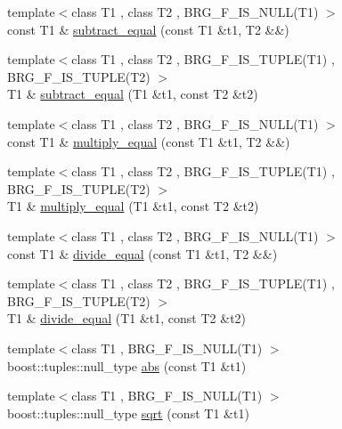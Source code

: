 \begin{DoxyCompactItemize}
\item 
{\footnotesize template$<$class T1 , class T2 , B\-R\-G\-\_\-\-F\-\_\-\-I\-S\-\_\-\-N\-U\-L\-L(\-T1) $>$ }\\const T1 \& \hyperlink{namespaceIceBRG_aba433f0f1df8de11e5f738da8ef67d39}{subtract\-\_\-equal} (const T1 \&t1, T2 \&\&)
\item 
{\footnotesize template$<$class T1 , class T2 , B\-R\-G\-\_\-\-F\-\_\-\-I\-S\-\_\-\-T\-U\-P\-L\-E(\-T1) , B\-R\-G\-\_\-\-F\-\_\-\-I\-S\-\_\-\-T\-U\-P\-L\-E(\-T2) $>$ }\\T1 \& \hyperlink{namespaceIceBRG_aa00439fb1f98b5ab3fd4435a4ff85325}{subtract\-\_\-equal} (T1 \&t1, const T2 \&t2)
\item 
{\footnotesize template$<$class T1 , class T2 , B\-R\-G\-\_\-\-F\-\_\-\-I\-S\-\_\-\-N\-U\-L\-L(\-T1) $>$ }\\const T1 \& \hyperlink{namespaceIceBRG_a7a4405ff31b49e9215bd1ace7a8d1e9d}{multiply\-\_\-equal} (const T1 \&t1, T2 \&\&)
\item 
{\footnotesize template$<$class T1 , class T2 , B\-R\-G\-\_\-\-F\-\_\-\-I\-S\-\_\-\-T\-U\-P\-L\-E(\-T1) , B\-R\-G\-\_\-\-F\-\_\-\-I\-S\-\_\-\-T\-U\-P\-L\-E(\-T2) $>$ }\\T1 \& \hyperlink{namespaceIceBRG_a8a9b9c18a8f33f1e7a11e3c5074ad657}{multiply\-\_\-equal} (T1 \&t1, const T2 \&t2)
\item 
{\footnotesize template$<$class T1 , class T2 , B\-R\-G\-\_\-\-F\-\_\-\-I\-S\-\_\-\-N\-U\-L\-L(\-T1) $>$ }\\const T1 \& \hyperlink{namespaceIceBRG_afa3822bbe4a1004507a161f17facc454}{divide\-\_\-equal} (const T1 \&t1, T2 \&\&)
\item 
{\footnotesize template$<$class T1 , class T2 , B\-R\-G\-\_\-\-F\-\_\-\-I\-S\-\_\-\-T\-U\-P\-L\-E(\-T1) , B\-R\-G\-\_\-\-F\-\_\-\-I\-S\-\_\-\-T\-U\-P\-L\-E(\-T2) $>$ }\\T1 \& \hyperlink{namespaceIceBRG_a5634c6e0abab0629573daa2c53f9101b}{divide\-\_\-equal} (T1 \&t1, const T2 \&t2)
\item 
{\footnotesize template$<$class T1 , B\-R\-G\-\_\-\-F\-\_\-\-I\-S\-\_\-\-N\-U\-L\-L(\-T1) $>$ }\\boost\-::tuples\-::null\-\_\-type \hyperlink{namespaceIceBRG_a26641f6efbb3a938bb24d35ed496af37}{abs} (const T1 \&t1)
\item 
{\footnotesize template$<$class T1 , B\-R\-G\-\_\-\-F\-\_\-\-I\-S\-\_\-\-N\-U\-L\-L(\-T1) $>$ }\\boost\-::tuples\-::null\-\_\-type \hyperlink{namespaceIceBRG_a6d1f86374f5747fba2a4af3fc6672580}{sqrt} (const T1 \&t1)

\end{DoxyCompactItemize}
